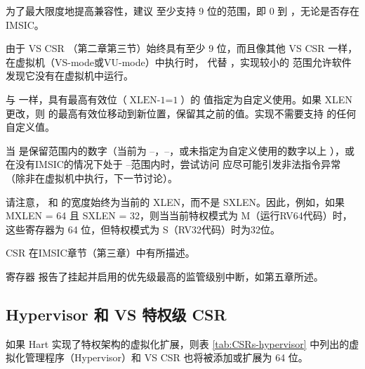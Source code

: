 \begin{translation}
为了最大限度地提高兼容性，建议  至少支持 9 位的范围，即 0 到 ，无论是否存在IMSIC。

\begin{commentary}
由于 VS CSR （第二章第三节）始终具有至少 9 位，而且像其他 VS CSR 一样，在虚拟机（\mbox{VS-mode}或\mbox{VU-mode}）中执行时， 代替 ，实现较小的  范围允许软件发现它没有在虚拟机中运行。
\end{commentary}

与  一样，具有最高有效位（$\mbox{XLEN-1}=\mbox{1}$）的  值指定为自定义使用。如果 XLEN 更改，则  的最高有效位移动到新位置，保留其之前的值。实现不需要支持 的任何自定义值。

当  是保留范围内的数字（当前为 --，--，或未指定为自定义使用的数字以上 ），或在没有IMSIC的情况下处于 --范围内时，尝试访问  应尽可能引发非法指令异常（除非在虚拟机中执行，下一节讨论）。

请注意， 和  的宽度始终为当前的 XLEN，而不是 SXLEN。因此，例如，如果 MXLEN = 64 且 SXLEN = 32，则当当前特权模式为 M（运行RV64代码）时，这些寄存器为 64 位，但特权模式为 S（RV32代码）时为32位。

CSR  在IMSIC章节（第三章）中有所描述。

寄存器  报告了挂起并启用的优先级最高的监管级别中断，如第五章所述。

\subsection{Hypervisor 和 VS 特权级 CSR}

如果 Hart 实现了特权架构的虚拟化扩展，则表 \ref{tab:CSRs-hypervisor} 中列出的虚拟化管理程序（Hypervisor）和 VS CSR 也将被添加或扩展为 64 位。


\end{translation}
